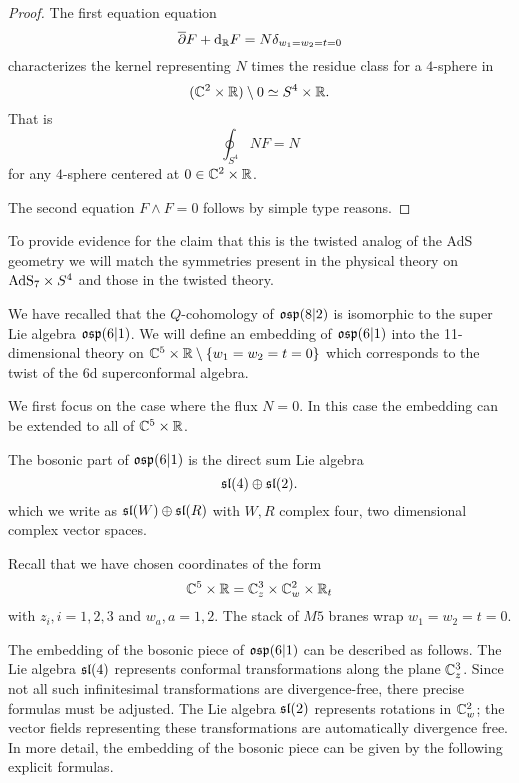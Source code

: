 \begin{proof}
The first equation equation 
\[
\overline{\partial} F + {\rm d}_{\mathbb R} F = N \delta_{w_1=w_2=t=0}
\]
characterizes the kernel representing $N$ times the residue class for a $4$-sphere in 
\[
(\mathbb C^2 \times \mathbb R) \setminus 0 \simeq S^4 \times \mathbb R .
\] 
That is
\[
\oint_{S^4} N F = N 
\]
for any $4$-sphere centered at $0 \in \mathbb C^2 \times \mathbb R$.

The second equation $F \wedge F = 0$ follows by simple type reasons. 
\end{proof}

\parsec[s:m5embedding]

To provide evidence for the claim that this is the twisted analog of the AdS geometry we will match the symmetries present in the physical theory on ${\rm AdS}_7 \times S^4$ and those in the twisted theory. 

We have recalled that the $Q$-cohomology of $\mathfrak{osp}(8|2)$ is isomorphic to the super Lie algebra $\mathfrak{osp}(6|1)$. 
We will define an embedding of $\mathfrak{osp}(6|1)$ into the 11-dimensional theory on $\mathbb C^5 \times \mathbb R \setminus \{w_1=w_2=t=0\}$ which corresponds to the twist of the 6d superconformal algebra.

We first focus on the case where the flux $N=0$.
In this case the embedding can be extended to all of $\mathbb C^5 \times \mathbb R$. 

The bosonic part of $\mathfrak{osp}(6|1)$ is the direct sum Lie algebra
\[
\mathfrak{sl}(4) \oplus \mathfrak{sl}(2) .
\]
which we write as $\mathfrak{sl}(W) \oplus \mathfrak{sl}(R)$ with $W,R$ complex four, two dimensional complex vector spaces. 

Recall that we have chosen coordinates of the form
\[
\mathbb C^5 \times \mathbb R = \mathbb C_z^3 \times \mathbb C_w^2 \times \mathbb R_t
\]
with $z_i, i=1,2,3$ and $w_a, a=1,2$.
The stack of $M5$ branes wrap $w_1=w_2=t=0$. 

The embedding of the bosonic piece of $\mathfrak{osp}(6|1)$ can be described as follows. 
The Lie algebra $\mathfrak{sl}(4)$ represents conformal transformations along the plane $\mathbb C^3_z$.
Since not all such infinitesimal transformations are divergence-free, there precise formulas must be adjusted.   
The Lie algebra $\mathfrak{sl}(2)$ represents rotations in $\mathbb C^2_w$; the vector fields representing these transformations are automatically divergence free.
In more detail, the embedding of the bosonic piece can be given by the following explicit formulas. 

